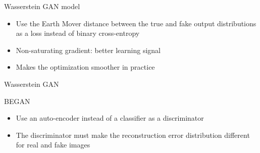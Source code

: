 \begin{frame}{Wasserstein GAN model}
  \begin{itemize}[<+->]
    \item Use the Earth Mover distance between the true and fake output distributions as a loss instead of binary cross-entropy
    \item Non-saturating gradient: better learning signal
    \item Makes the optimization smoother in practice
  \end{itemize}
\end{frame}

\begin{frame}{Wasserstein GAN}
\end{frame}

\begin{frame}{BEGAN}
  \begin{itemize}[<+->]
    \item Use an auto-encoder instead of a classifier as a discriminator
    \item The discriminator must make the reconstruction error distribution different for real and fake images
  \end{itemize}
\end{frame}
